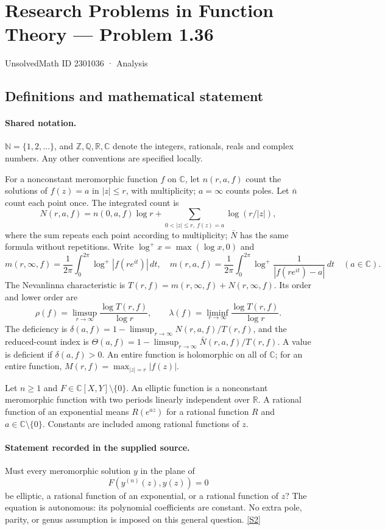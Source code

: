 \documentclass[11pt]{article}
\newcommand{\sref}[2]{\hyperlink{source:#1:#2}{[S#2]}}
\begin{document}
\setcounter{section}{2301035}
\section{Research Problems in Function Theory — Problem 1.36}\label{2301036}
{\small\sffamily UnsolvedMath ID 2301036 · Analysis}
\subsection{Definitions and mathematical statement}

\paragraph{Shared notation.}$\mathbb N=\{1,2,\ldots\}$, and $\mathbb Z,\mathbb Q,\mathbb R,\mathbb C$ denote the integers, rationals, reals and complex numbers. Any other conventions are specified locally.


For a nonconstant meromorphic function $f$ on $\mathbb C$, let $n(r,a,f)$ count the solutions of $f(z)=a$ in $|z|\le r$, with multiplicity; $a=\infty$ counts poles. Let $\bar n$ count each point once. The integrated count is
\[
 N(r,a,f)=n(0,a,f)\log r+\sum_{0<|z|\le r,\ f(z)=a}\log(r/|z|),
\]
where the sum repeats each point according to multiplicity; $\bar N$ has the same formula without repetitions. Write $\log^+x=\max(\log x,0)$ and
\[
 m(r,\infty,f)=\frac1{2\pi}\int_0^{2\pi}\log^+|f(re^{it})|\,dt,\quad
 m(r,a,f)=\frac1{2\pi}\int_0^{2\pi}\log^+\frac1{|f(re^{it})-a|}\,dt\quad(a\in\mathbb C).
\]
The Nevanlinna characteristic is $T(r,f)=m(r,\infty,f)+N(r,\infty,f)$. Its order and lower order are
\[
 \rho(f)=\limsup_{r\to\infty}\frac{\log T(r,f)}{\log r},\qquad
 \lambda(f)=\liminf_{r\to\infty}\frac{\log T(r,f)}{\log r}.
\]
The deficiency is $\delta(a,f)=1-\limsup_{r\to\infty}N(r,a,f)/T(r,f)$, and the reduced-count index is $\Theta(a,f)=1-\limsup_{r\to\infty}\bar N(r,a,f)/T(r,f)$. A value is deficient if $\delta(a,f)>0$. An entire function is holomorphic on all of $\mathbb C$; for an entire function, $M(r,f)=\max_{|z|=r}|f(z)|$.

Let $n\ge1$ and $F\in\mathbb C[X,Y]\setminus\{0\}$. An elliptic function is a nonconstant meromorphic function with two periods linearly independent over $\mathbb R$. A rational function of an exponential means $R(e^{az})$ for a rational function $R$ and $a\in\mathbb C\setminus\{0\}$. Constants are included among rational functions of $z$.
\paragraph{Statement recorded in the supplied source.}
Must every meromorphic solution $y$ in the plane of
\[
 F(y^{(n)}(z),y(z))=0
\]
be elliptic, a rational function of an exponential, or a rational function of $z$? The equation is autonomous: its polynomial coefficients are constant. No extra pole, parity, or genus assumption is imposed on this general question. \sref{2301036}{2}
\end{document}
